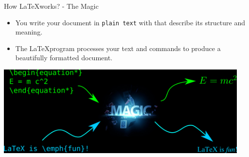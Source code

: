 \documentclass[10pt,times]{beamer}
\begin{document}
\begin{frame}{How \LaTeX works? - The Magic}
\begin{itemize}
\item You write your document in \texttt{plain text} with  that
describe its structure and meaning.
\item The \LaTeX program processes your text and commands to produce a
beautifully formatted document.
\end{itemize}

\centering
\includegraphics[width=0.95\textwidth]{figs/magic.png}
\end{frame}

\end{document}
